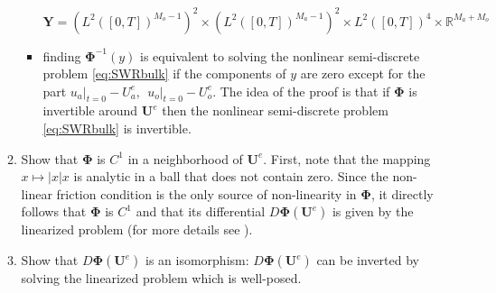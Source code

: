 \begin{enumerate}
\begin{enumerate}
\begin{itemize}
 	\begin{equation}
		\mathbf{Y}=\left(L^2([0,T])^{M_o-1}\right)^2 
			\times \left(L^2([0,T])^{M_a-1}\right)^2
 			\times L^2([0,T])^{4}
			\times \mathbb{R}^{M_a+M_o}
 	\end{equation}
\item 
finding $\mathbf{\Phi}^{-1}(y)$ is equivalent
to solving the nonlinear semi-discrete problem
\eqref{eq:SWRbulk} if the components of $y$ are zero except for the
part $\left.u_a\right|_{t=0} - U^e_{a}, ~~
	\left.u_o\right|_{t=0} - U^e_{o}$.
The idea of the proof is that if $\mathbf{\Phi}$ is invertible
around $\mathbf{U}^e$ then the nonlinear semi-discrete problem
\eqref{eq:SWRbulk} is invertible.
\end{itemize}
		\item Show that $\mathbf{\Phi}$ is $C^1$ in a
			neighborhood of $\mathbf{U}^e$.
			First, note that the mapping
			$x \mapsto |x|x$ is analytic in a
			ball that does not contain zero.
			Since the non-linear friction condition
			is the only source of
			non-linearity in $\mathbf{\Phi}$,
			it directly follows that
			$\mathbf{\Phi}$ is $C^1$ and that
			its differential
			$D\mathbf{\Phi}(\mathbf{U}^e)$ is given
			by the linearized problem (for more
			details see
			\cite{chacon-rebollo_existence_2014}).
		\item Show that $D\mathbf{\Phi}(\mathbf{U}^e)$
		is an isomorphism:
		$D\mathbf{\Phi}(\mathbf{U}^e)$ can
		be inverted by solving the linearized problem which
		is well-posed.
	\end{enumerate}
\end{enumerate}
